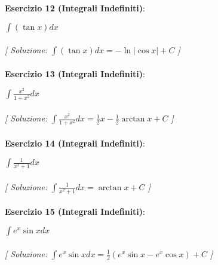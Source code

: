 \documentclass{article}
\begin{document}
\textbf{Esercizio 12 (Integrali Indefiniti)}:\\
\par $\int (\tan x)  dx$ \\\\

\textit{[ Soluzione: $\int (\tan x)  dx = -\ln |\cos x| + C$ ]}\\\\

\textbf{Esercizio 13 (Integrali Indefiniti)}:\\
\par $\int \frac{x^2}{1 + x^2}  dx$ \\\\

\textit{[ Soluzione: $\int \frac{x^2}{1 + x^2}  dx = \frac{1}{2}x - \frac{1}{2}\arctan x + C$ ]}\\\\

\textbf{Esercizio 14 (Integrali Indefiniti)}:\\
\par $\int \frac{1}{x^2 + 1}  dx$ \\\\

\textit{[ Soluzione: $\int \frac{1}{x^2 + 1}  dx = \arctan x + C$ ]}\\\\

\textbf{Esercizio 15 (Integrali Indefiniti)}:\\
\par $\int e^x \sin x  dx$ \\\\

\textit{[ Soluzione: $\int e^x \sin x  dx = \frac{1}{2}(e^x\sin x - e^x\cos x) + C$ ]}\\\\
\end{document}
